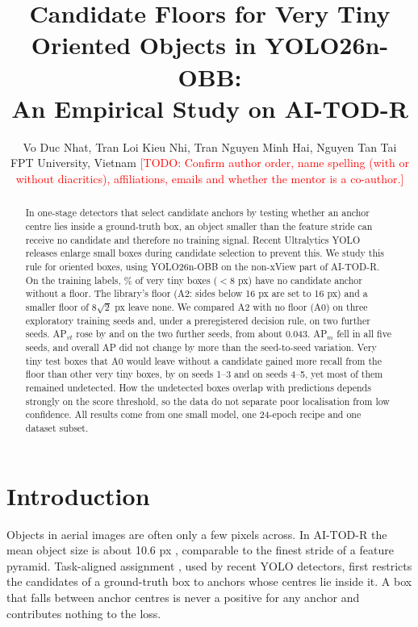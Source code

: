 \documentclass[11pt]{article}
\newcommand{\todo}[1]{\textcolor{red}{[TODO: #1]}}
\begin{document}
\title{Candidate Floors for Very Tiny Oriented Objects in YOLO26n-OBB:\\ An Empirical Study on AI-TOD-R}
\author{Vo Duc Nhat, Tran Loi Kieu Nhi, Tran Nguyen Minh Hai, Nguyen Tan Tai\\ FPT University, Vietnam
\todo{Confirm author order, name spelling (with or without diacritics), affiliations, emails and whether the mentor is a co-author.}}
\date{}
\maketitle

\begin{abstract}
In one-stage detectors that select candidate anchors by testing whether an anchor centre lies inside a ground-truth box,
an object smaller than the feature stride can receive no candidate and therefore no training signal. Recent Ultralytics
YOLO releases enlarge small boxes during candidate selection to prevent this. We study this rule for oriented boxes, using
YOLO26n-OBB on the non-xView part of AI-TOD-R. On the training labels, \rqZeroCandVtA\% of very tiny boxes ($<8$ px) have
no candidate anchor without a floor. The library's floor (A2: sides below 16 px are set to 16 px) and a smaller floor of
$8\sqrt2$ px leave none. We compared A2 with no floor (A0) on three exploratory training seeds and, under a preregistered
decision rule, on two further seeds. AP$_{vt}$ rose by \pOneSFour{} and \pOneSFive{} on the two further seeds, from about
0.043. AP$_m$ fell in all five seeds, and overall AP did not change by more than the seed-to-seed variation. Very tiny
test boxes that A0 would leave without a candidate gained more recall from the floor than other very tiny boxes, by
\mOneOld{} on seeds 1--3 and \mOneNew{} on seeds 4--5, yet most of them remained undetected. How the undetected boxes
overlap with predictions depends strongly on the score threshold, so the data do not separate poor localisation from low
confidence. All results come from one small model, one 24-epoch recipe and one dataset subset.
\end{abstract}

\section{Introduction}
Objects in aerial images are often only a few pixels across. In AI-TOD-R the mean object size is about 10.6 px
\cite{aitodr}, comparable to the finest stride of a feature pyramid. Task-aligned assignment \cite{tood}, used by recent
YOLO detectors, first restricts the candidates of a ground-truth box to anchors whose centres lie inside it. A box that
falls between anchor centres is never a positive for any anchor and contributes nothing to the loss.
\end{document}
